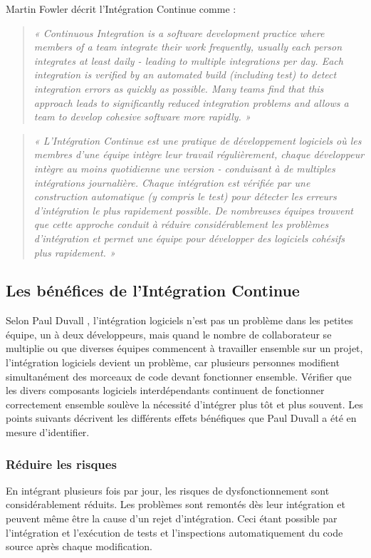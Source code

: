 \documentclass{report}
\begin{document}
    Martin Fowler \cite{Fow00} décrit l’Intégration Continue comme :\\
    \begin{quotation}
      \emph{« Continuous Integration is a software development practice where members of a team integrate their work frequently, usually each person integrates at least daily - leading to multiple integrations per day. Each integration is verified by an automated build (including test) to detect integration errors as quickly as possible. Many teams find that this approach leads to significantly reduced integration problems and allows a team to develop cohesive software more rapidly. »}
    \end{quotation}

    \begin{quotation}
      \emph{« L'Intégration Continue est une pratique de développement logiciels où les membres d'une équipe intègre leur travail régulièrement, chaque développeur intègre au moins quotidienne une version - conduisant à de multiples intégrations journalière. Chaque intégration est vérifiée par une construction automatique (y compris le test) pour détecter les erreurs d'intégration le plus rapidement possible. De nombreuses équipes trouvent que cette approche conduit à réduire considérablement les problèmes d'intégration et permet une équipe pour développer des logiciels cohésifs plus rapidement. »}\\
    \end{quotation}

      \subsection{Les bénéfices de l’Intégration Continue}
      Selon Paul Duvall \cite{Duv07}, l'intégration logiciels n’est pas un problème dans les petites équipe, un à deux développeurs, mais quand le nombre de collaborateur se multiplie ou que diverses équipes commencent à travailler ensemble sur un projet, l'intégration logiciels devient un problème, car plusieurs personnes modifient simultanément des morceaux de code devant fonctionner ensemble. Vérifier que les divers composants logiciels interdépendants continuent de fonctionner correctement ensemble soulève la nécessité d'intégrer plus tôt et plus souvent. Les points suivants décrivent les différents effets bénéfiques que Paul Duvall a été en mesure d'identifier.

        \subsubsection{Réduire les risques}
        En intégrant plusieurs fois par jour, les risques de dysfonctionnement sont considérablement réduits. Les problèmes sont remontés dès leur intégration et peuvent même être la cause d’un rejet d’intégration. Ceci étant possible par l’intégration et l’exécution de tests et l’inspections automatiquement du code source après chaque modification.
\end{document}
